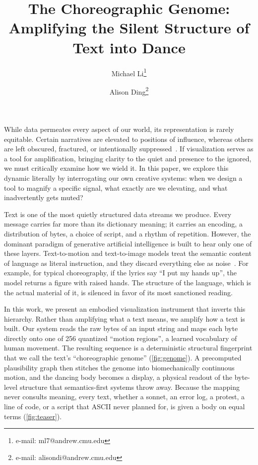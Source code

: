 \documentclass{vgtc}                          %
\title{The Choreographic Genome:\\Amplifying the Silent Structure of Text into Dance}
\author{Michael Li\thanks{e-mail: ml7@andrew.cmu.edu}
\and Alison Ding\thanks{e-mail: alisondi@andrew.cmu.edu}}
\affiliation{\scriptsize Carnegie Mellon University}
\begin{document}

\maketitle

While data permeates every aspect of our world, its representation is rarely equitable. Certain narratives are elevated to positions of influence, whereas others are left obscured, fractured, or intentionally suppressed~\cite{dignazio2020datafeminism,gitelman2013rawdata}. If visualization serves as a tool for amplification, bringing clarity to the quiet and presence to the ignored, we must critically examine how we wield it. In this paper, we explore this dynamic literally by interrogating our own creative systems: when we design a tool to magnify a specific signal, what exactly are we elevating, and what inadvertently gets muted?

Text is one of the most quietly structured data streams we produce. Every message
carries far more than its dictionary meaning; it carries an encoding, a
distribution of bytes, a choice of script, and a rhythm of repetition. However,
the dominant paradigm of generative artificial intelligence is built to hear only
one of these layers. Text-to-motion and text-to-image models treat the semantic
content of language as literal instruction, and they discard everything else as
noise~\cite{li2021aist,stanford2023edge}. For example, for typical choreography, if the lyrics say ``I put my hands up'', the model returns a figure with raised
hands. The structure of the language, which is the
actual material of it, is silenced in favor of its most sanctioned reading.

In this work, we present an embodied visualization instrument that inverts this
hierarchy. Rather than amplifying what a text means, we amplify how a text is
built. Our system reads the raw bytes of an input string and maps each byte
directly onto one of 256 quantized ``motion regions'', a learned vocabulary of
human movement. The resulting sequence is a deterministic structural fingerprint
that we call the text's ``choreographic genome'' (\cref{fig:genome}). A
precomputed plausibility graph then stitches the genome into biomechanically
continuous motion, and the dancing body becomes a display, a physical readout of
the byte-level structure that semantics-first systems throw away. Because the
mapping never consults meaning, every text, whether a sonnet, an error log, a
protest, a line of code, or a script that ASCII never planned for, is given a body
on equal terms (\cref{fig:teaser}).
\end{document}
